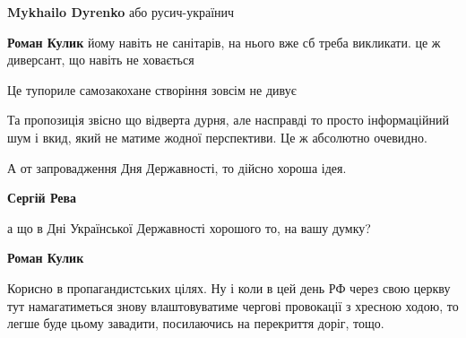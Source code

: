 \begin{itemize}
\begin{itemize}
\textbf{Mykhailo Dyrenko} або русич-українич

 
\textbf{Роман Кулик} йому навіть не санітарів, на нього вже сб треба викликати. це ж диверсант, що навіть не ховається

 
Це тупориле самозакохане створіння зовсім не дивує

\end{itemize}

 

Та пропозиція звісно що відверта дурня, але насправді то просто інформаційний
шум і вкид, який не матиме жодної перспективи. Це ж абсолютно очевидно.

А от запровадження Дня Державності, то дійсно хороша ідея.

\begin{itemize}
 
\textbf{Сергій Рева} 

а що в Дні Української Державності хорошого то, на вашу думку?

 
\textbf{Роман Кулик} 

Корисно в пропагандистських цілях. Ну і коли в цей день РФ через свою церкву
тут намагатиметься знову влаштовуватиме чергові провокації з хресною ходою, то
легше буде цьому завадити, посилаючись на перекриття доріг, тощо.




\end{itemize}
\end{itemize}
